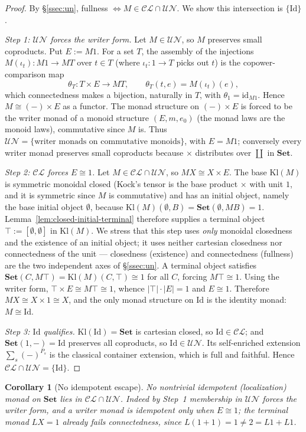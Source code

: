 \documentclass[11pt]{amsart}
\theoremstyle{plain}
\newtheorem{corollary}[theorem]{Corollary}
\theoremstyle{definition}
\theoremstyle{remark}
\newcommand{\Set}{\mathbf{Set}}
\newcommand{\Kl}{\mathrm{Kl}}
\newcommand{\id}{\mathrm{id}}
\newcommand{\Id}{\mathrm{Id}}
\newcommand{\CL}{\mathcal{CL}}
\newcommand{\UN}{\mathcal{UN}}
\begin{document}
\begin{proof}
By \S\ref{ssec:un}, fullness $\iff M\in\CL\cap\UN$. We show this intersection is $\{\Id\}$.

\emph{Step 1: $\UN$ forces the writer form.} Let $M\in\UN$, so $M$ preserves small coproducts. Put
$E:=M1$. For a set $T$, the assembly of the injections $M(\iota_t)\colon M1\to MT$ over $t\in T$
(where $\iota_t\colon 1\to T$ picks out $t$) is the copower-comparison map
\[
  \theta_T\colon T\times E\longrightarrow MT,\qquad \theta_T(t,e)=M(\iota_t)(e),
\]
which connectedness makes a bijection, naturally in $T$, with $\theta_1=\id_{M1}$. Hence
$M\cong(-)\times E$ as a functor. The monad structure on $(-)\times E$ is forced to be the writer
monad of a monoid structure $(E,m,e_0)$ (the monad laws are the monoid laws), commutative since $M$
is. Thus $\UN=\{\text{writer monads on commutative monoids}\}$, with $E=M1$; conversely every writer
monad preserves small coproducts because $\times$ distributes over $\coprod$ in $\Set$.

\emph{Step 2: $\CL$ forces $E\cong1$.} Let $M\in\CL\cap\UN$, so $MX\cong X\times E$. The base
$\Kl(M)$ is symmetric monoidal closed (Kock's tensor is the base product $\times$ with unit $1$, and it
is symmetric since $M$ is commutative) and has an initial object, namely the base initial object
$\emptyset$, because $\Kl(M)(\emptyset,B)=\Set(\emptyset,MB)=1$. Lemma~\ref{lem:closed-initial-terminal}
therefore supplies a terminal object $\top:=[\emptyset,\emptyset]$ in $\Kl(M)$. We stress that this step
uses \emph{only} monoidal closedness and the existence of an initial object; it uses neither cartesian
closedness nor connectedness of the unit --- closedness (existence) and connectedness (fullness) are the
two independent axes of \S\ref{ssec:un}. A terminal object
satisfies $\Set(C,M\top)=\Kl(M)(C,\top)\cong1$ for all $C$, forcing $M\top\cong1$. Using the writer
form, $\top\times E\cong M\top\cong1$, whence $|\top|\cdot|E|=1$ and $E\cong1$. Therefore
$MX\cong X\times1\cong X$, and the only monad structure on $\Id$ is the identity monad: $M\cong\Id$.

\emph{Step 3: $\Id$ qualifies.} $\Kl(\Id)=\Set$ is cartesian closed, so $\Id\in\CL$; and
$\Set(1,-)=\Id$ preserves all coproducts, so $\Id\in\UN$. Its self-enriched extension
$\sum_s(-)^{P_s}$ is the classical container extension, which is full and faithful. Hence
$\CL\cap\UN=\{\Id\}$.
\end{proof}

\begin{corollary}[No idempotent escape]\label{cor:idem}
No nontrivial idempotent (localization) monad on $\Set$ lies in $\CL\cap\UN$. Indeed by Step~1
membership in $\UN$ forces the writer form, and a writer monad is idempotent only when $E\cong1$; the
terminal monad $LX=1$ already fails connectedness, since $L(1+1)=1\ne 2=L1+L1$.
\end{corollary}
\end{document}
